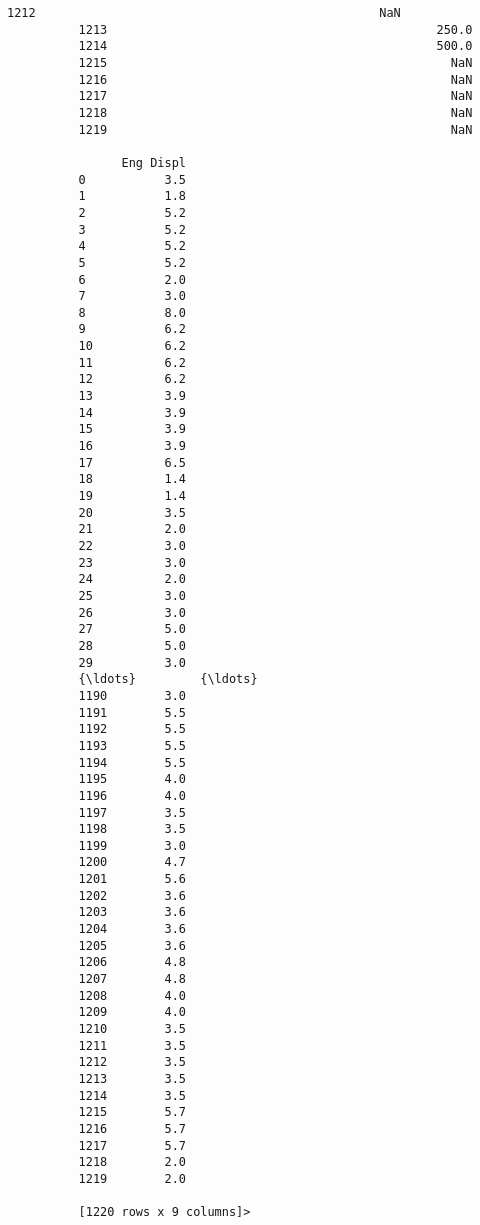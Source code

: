 \documentclass[11pt]{article}
\begin{document}
\begin{Verbatim}[commandchars=\\\{\}]
          1212                                                NaN                               
          1213                                              250.0                               
          1214                                              500.0                               
          1215                                                NaN                               
          1216                                                NaN                               
          1217                                                NaN                               
          1218                                                NaN                               
          1219                                                NaN                               
          
                Eng Displ  
          0           3.5  
          1           1.8  
          2           5.2  
          3           5.2  
          4           5.2  
          5           5.2  
          6           2.0  
          7           3.0  
          8           8.0  
          9           6.2  
          10          6.2  
          11          6.2  
          12          6.2  
          13          3.9  
          14          3.9  
          15          3.9  
          16          3.9  
          17          6.5  
          18          1.4  
          19          1.4  
          20          3.5  
          21          2.0  
          22          3.0  
          23          3.0  
          24          2.0  
          25          3.0  
          26          3.0  
          27          5.0  
          28          5.0  
          29          3.0  
          {\ldots}         {\ldots}  
          1190        3.0  
          1191        5.5  
          1192        5.5  
          1193        5.5  
          1194        5.5  
          1195        4.0  
          1196        4.0  
          1197        3.5  
          1198        3.5  
          1199        3.0  
          1200        4.7  
          1201        5.6  
          1202        3.6  
          1203        3.6  
          1204        3.6  
          1205        3.6  
          1206        4.8  
          1207        4.8  
          1208        4.0  
          1209        4.0  
          1210        3.5  
          1211        3.5  
          1212        3.5  
          1213        3.5  
          1214        3.5  
          1215        5.7  
          1216        5.7  
          1217        5.7  
          1218        2.0  
          1219        2.0  
          
          [1220 rows x 9 columns]>
\end{Verbatim}
        
\end{document}
